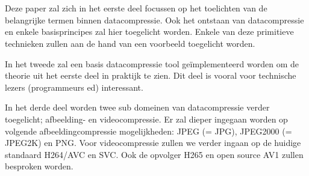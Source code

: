 
\section{}
\label{sec:onderzoeksdoelstelling}


\section{}
\label{sec:opzet-bachelorproef}


Deze paper zal zich in het eerste deel focussen op het toelichten van de belangrijke termen binnen datacompressie. Ook het ontstaan van datacompressie en enkele basisprincipes zal hier toegelicht worden. Enkele van deze primitieve technieken zullen aan de hand van een voorbeeld toegelicht worden.
 
 In het tweede zal een basis datacompressie tool geïmplementeerd worden om de theorie uit het eerste deel in praktijk te zien.
Dit deel is vooral voor technische lezers (programmeurs ed) interessant.

In het derde deel worden twee sub domeinen van datacompressie verder toegelicht; afbeelding- en videocompressie. Er zal dieper ingegaan worden op volgende afbeeldingcompressie mogelijkheden: JPEG (= JPG), JPEG2000 (= JPEG2K) en PNG. Voor videocompressie zullen we verder ingaan op de huidige standaard H264/AVC en SVC. Ook de opvolger H265 en open source AV1 zullen besproken worden.

